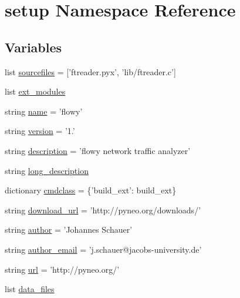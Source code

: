 \hypertarget{namespacesetup}{\section{setup \-Namespace \-Reference}
\label{namespacesetup}
}
\subsection*{\-Variables}
\begin{DoxyCompactItemize}
\item 
list \hyperlink{namespacesetup_a46318957478d47a26cf394c9cb6d6d8d}{sourcefiles} = \mbox{[}'ftreader.\-pyx', 'lib/ftreader.\-c'\mbox{]}
\item 
list \hyperlink{namespacesetup_adf64e6d585b775ff05a5c0d07dc5a78f}{ext\-\_\-modules}
\item 
string \hyperlink{namespacesetup_a4b28e5b21e957c451ff3aa28f58c6383}{name} = 'flowy'
\item 
string \hyperlink{namespacesetup_a8b86ddd5b5591d99de08e584197a53d9}{version} = '1.'
\item 
string \hyperlink{namespacesetup_a4ad612547892c74be7035043265eb65c}{description} = 'flowy network traffic analyzer'
\item 
string \hyperlink{namespacesetup_a718ebc1d14d8aaf7bf72092d219f19fa}{long\-\_\-description}
\item 
dictionary \hyperlink{namespacesetup_acba4bbef35b8f6cac96432395d7564a4}{cmdclass} = \{'build\-\_\-ext'\-: build\-\_\-ext\}
\item 
string \hyperlink{namespacesetup_a38a3b3d91352a32f3d426e75d0a68314}{download\-\_\-url} = 'http\-://pyneo.\-org/downloads/'
\item 
string \hyperlink{namespacesetup_a7b92894168460f935bc49467954c4a92}{author} = '\-Johannes \-Schauer'
\item 
string \hyperlink{namespacesetup_a4ead8e1ca45242906fde7d5489f3beaa}{author\-\_\-email} = 'j.\-schauer@jacobs-\/university.\-de'
\item 
string \hyperlink{namespacesetup_a7c3763764f99123690822c047e74c36e}{url} = 'http\-://pyneo.\-org/'
\item 
list \hyperlink{namespacesetup_a7c31b01320c210cfb3363c7e4c264eac}{data\-\_\-files}
\end{DoxyCompactItemize}


